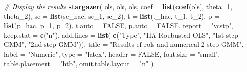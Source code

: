 \documentclass[
  12pt,
]{article}
\newenvironment{Shaded}{\begin{snugshade}}{\end{snugshade}}
\newcommand{\CommentTok}[1]{\textcolor[rgb]{0.56,0.35,0.01}{\textit{#1}}}
\newcommand{\DataTypeTok}[1]{\textcolor[rgb]{0.13,0.29,0.53}{#1}}
\newcommand{\DecValTok}[1]{\textcolor[rgb]{0.00,0.00,0.81}{#1}}
\newcommand{\KeywordTok}[1]{\textcolor[rgb]{0.13,0.29,0.53}{\textbf{#1}}}
\newcommand{\NormalTok}[1]{#1}
\newcommand{\OtherTok}[1]{\textcolor[rgb]{0.56,0.35,0.01}{#1}}
\newcommand{\StringTok}[1]{\textcolor[rgb]{0.31,0.60,0.02}{#1}}
\begin{document}
\begin{Shaded}
\begin{Highlighting}[]
\CommentTok{\# Display the results}
\KeywordTok{stargazer}\NormalTok{(}
\NormalTok{ols, ols, ols, }
\DataTypeTok{coef =} \KeywordTok{list}\NormalTok{(}\KeywordTok{coef}\NormalTok{(ols), theta\_}\DecValTok{1}\NormalTok{, theta\_}\DecValTok{2}\NormalTok{), }\DataTypeTok{se =} \KeywordTok{list}\NormalTok{(se\_hac, se\_}\DecValTok{1}\NormalTok{, se\_}\DecValTok{2}\NormalTok{),}
\DataTypeTok{t =} \KeywordTok{list}\NormalTok{(t\_hac, t\_}\DecValTok{1}\NormalTok{, t\_}\DecValTok{2}\NormalTok{), }\DataTypeTok{p =} \KeywordTok{list}\NormalTok{(p\_hac, p\_}\DecValTok{1}\NormalTok{, p\_}\DecValTok{2}\NormalTok{),}
\DataTypeTok{t.auto =} \OtherTok{FALSE}\NormalTok{, }\DataTypeTok{p.auto =} \OtherTok{FALSE}\NormalTok{,}
\DataTypeTok{report =} \StringTok{"vcstp"}\NormalTok{, }\DataTypeTok{keep.stat =} \KeywordTok{c}\NormalTok{(}\StringTok{"n"}\NormalTok{),}
\DataTypeTok{add.lines =} \KeywordTok{list}\NormalTok{(}
\KeywordTok{c}\NormalTok{(}\StringTok{"Type"}\NormalTok{, }\StringTok{"HA{-}Roubusted OLS"}\NormalTok{, }\StringTok{"1st step GMM"}\NormalTok{, }\StringTok{"2nd step GMM"}\NormalTok{)),}
\DataTypeTok{title =} \StringTok{"Results of rols and numerical 2 step GMM"}\NormalTok{,}
\DataTypeTok{label =} \StringTok{"Numeric"}\NormalTok{,}
\DataTypeTok{type =} \StringTok{"latex"}\NormalTok{, }\DataTypeTok{header =} \OtherTok{FALSE}\NormalTok{, }\DataTypeTok{font.size =} \StringTok{"small"}\NormalTok{,}
\DataTypeTok{table.placement =} \StringTok{"htb"}\NormalTok{, }\DataTypeTok{omit.table.layout =} \StringTok{"n"}
\NormalTok{)}
\end{Highlighting}
\end{Shaded}
\end{document}
